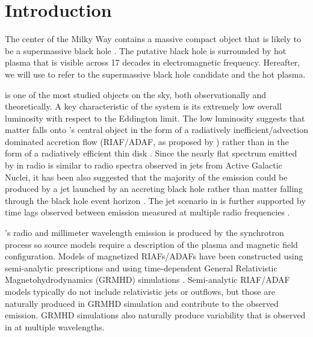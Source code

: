 \section{Introduction}
\label{sec:intro}

The center of the Milky Way contains a massive compact object that is likely to be a supermassive black hole \citep{2019Sci...365..664D, 2019A&A...625L..10G}.
The putative black hole is surrounded by hot plasma that is visible across 17 decades in electromagnetic frequency.
Hereafter, we will use \sgra to refer to the supermassive black hole candidate and the hot plasma.

\sgra is one of the most studied objects on the sky, both observationally and theoretically.
A key  characteristic of the \sgra system is its extremely low overall luminosity with respect to the Eddington limit.
The low luminosity suggests that matter falls onto \sgra's central object in the form of a radiatively inefficient/advection dominated accretion flow (RIAF/ADAF, as proposed by \citealt{1977ApJ...214..840I,1994ApJ...428L..13N, 1995ApJ...444..231N, 1995ApJ...452..710N, 1996A&AS..120C.287N, 1998ApJ...492..554N,2014ARA&A..52..529Y}) rather than in the form of a radiatively efficient thin disk \citep{1973A&A....24..337S}.
Since the nearly flat spectrum emitted by \sgra in radio is similar to radio spectra observed in jets from Active Galactic Nuclei, it has been also suggested that the majority of the \sgra emission could be produced by a jet launched by an accreting black hole rather than matter falling through the black hole event horizon \citep{1993A&A...278L...1F, 2000A&A...362..113F}.
The jet scenario in \sgra is further supported by time lags observed between emission measured at multiple radio frequencies \citep{2021arXiv210713402B}.

\sgra's radio and millimeter wavelength emission is produced by the  synchrotron process so source models require a description of the plasma and magnetic field configuration.
Models of magnetized RIAFs/ADAFs have been constructed using semi-analytic prescriptions \citep[e.g.,][]{1995Natur.374..623N,2000ApJ...541..234O, 2009ApJ...697...45B,2011ApJ...735..110B} and using time-dependent General Relativistic Magnetohydrodynamics (GRMHD) simulations \citep[e.g.,][]{2000ApJ...528..462H, 2003ApJ...589..458D, 2003ApJ...589..444G, 2007CQGra..24S.235G, 2012ApJS..201....9F, 2014ApJ...796...22F, 2016ApJS..225...22W, 2017ApJS..231...17A, 2018JPhCS1031a2008O, Olivares2019, 2019ApJS..243...26P}.
Semi-analytic RIAF/ADAF models typically do not include relativistic jets or outflows, but those are naturally produced in GRMHD simulation and contribute to the observed emission.
GRMHD simulations also naturally produce variability that is observed in \sgra at multiple wavelengths.

